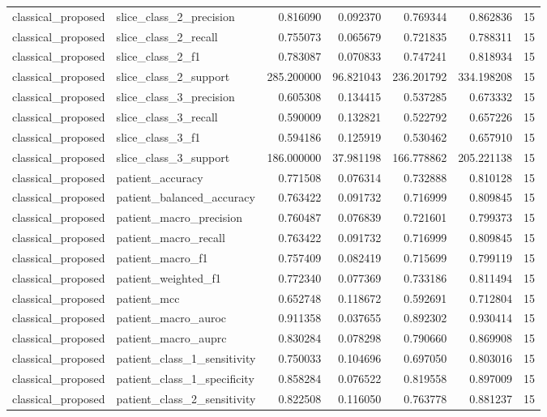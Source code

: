 \begin{tabular}{llrrrrr}
classical_proposed & slice_class_2_precision & 0.816090 & 0.092370 & 0.769344 & 0.862836 & 15 \\
classical_proposed & slice_class_2_recall & 0.755073 & 0.065679 & 0.721835 & 0.788311 & 15 \\
classical_proposed & slice_class_2_f1 & 0.783087 & 0.070833 & 0.747241 & 0.818934 & 15 \\
classical_proposed & slice_class_2_support & 285.200000 & 96.821043 & 236.201792 & 334.198208 & 15 \\
classical_proposed & slice_class_3_precision & 0.605308 & 0.134415 & 0.537285 & 0.673332 & 15 \\
classical_proposed & slice_class_3_recall & 0.590009 & 0.132821 & 0.522792 & 0.657226 & 15 \\
classical_proposed & slice_class_3_f1 & 0.594186 & 0.125919 & 0.530462 & 0.657910 & 15 \\
classical_proposed & slice_class_3_support & 186.000000 & 37.981198 & 166.778862 & 205.221138 & 15 \\
classical_proposed & patient_accuracy & 0.771508 & 0.076314 & 0.732888 & 0.810128 & 15 \\
classical_proposed & patient_balanced_accuracy & 0.763422 & 0.091732 & 0.716999 & 0.809845 & 15 \\
classical_proposed & patient_macro_precision & 0.760487 & 0.076839 & 0.721601 & 0.799373 & 15 \\
classical_proposed & patient_macro_recall & 0.763422 & 0.091732 & 0.716999 & 0.809845 & 15 \\
classical_proposed & patient_macro_f1 & 0.757409 & 0.082419 & 0.715699 & 0.799119 & 15 \\
classical_proposed & patient_weighted_f1 & 0.772340 & 0.077369 & 0.733186 & 0.811494 & 15 \\
classical_proposed & patient_mcc & 0.652748 & 0.118672 & 0.592691 & 0.712804 & 15 \\
classical_proposed & patient_macro_auroc & 0.911358 & 0.037655 & 0.892302 & 0.930414 & 15 \\
classical_proposed & patient_macro_auprc & 0.830284 & 0.078298 & 0.790660 & 0.869908 & 15 \\
classical_proposed & patient_class_1_sensitivity & 0.750033 & 0.104696 & 0.697050 & 0.803016 & 15 \\
classical_proposed & patient_class_1_specificity & 0.858284 & 0.076522 & 0.819558 & 0.897009 & 15 \\
classical_proposed & patient_class_2_sensitivity & 0.822508 & 0.116050 & 0.763778 & 0.881237 & 15 \\

\end{tabular}
